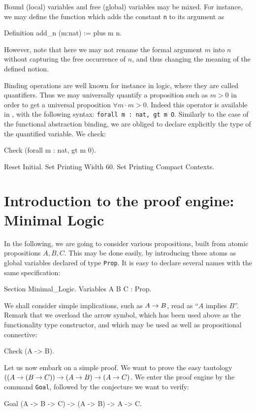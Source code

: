 \documentclass[11pt,a4paper]{book}
\begin{document}
Bound (local) variables and free (global) variables may be mixed.
For instance, we may define the function which adds the constant \verb:n:
to its argument as
\begin{coq_example}
Definition add_n (m:nat) := plus m n.
\end{coq_example}
However, note that here we may not rename the formal argument $m$ into $n$
without capturing the free occurrence of $n$, and thus changing the meaning
of the defined notion.

Binding operations are well known for instance in logic, where they
are called quantifiers.  Thus we may universally quantify a
proposition such as $m>0$ in order to get a universal proposition
$\forall m\cdot m>0$. Indeed this operator is available in \Coq, with
the following syntax: \texttt{forall m : nat, gt m O}. Similarly to the
case of the functional abstraction binding, we are obliged to declare
explicitly the type of the quantified variable. We check:
\begin{coq_example}
Check (forall m : nat, gt m 0).
\end{coq_example}

\begin{coq_eval}
Reset Initial.
Set Printing Width 60.
Set Printing Compact Contexts.
\end{coq_eval}

\section{Introduction to the proof engine: Minimal Logic}

In the following, we are going to consider various propositions, built
from atomic propositions $A, B, C$. This may be done easily, by
introducing these atoms as global variables declared of type \verb:Prop:.
It is easy to declare several names with the same specification:
\begin{coq_example}
Section Minimal_Logic.
Variables A B C : Prop.
\end{coq_example}

We shall consider simple implications, such as $A\rightarrow B$, read as 
``$A$ implies $B$''. Remark that we overload the arrow symbol, which
has been used above as the functionality type constructor, and which
may be used as well as propositional connective:
\begin{coq_example}
Check (A -> B).
\end{coq_example}

Let us now embark on a simple proof. We want to prove the easy tautology
$((A\rightarrow (B\rightarrow C))\rightarrow (A\rightarrow B)\rightarrow (A\rightarrow C)$. 
We enter the proof engine by the command
\verb:Goal:, followed by the conjecture we want to verify:
\begin{coq_example}
Goal (A -> B -> C) -> (A -> B) -> A -> C.
\end{coq_example}
\end{document}

